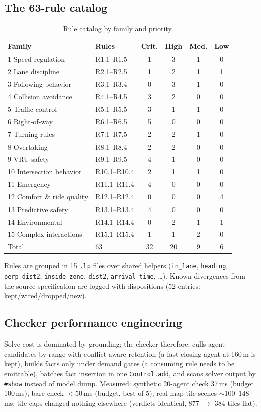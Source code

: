 \documentclass[11pt]{article}
\begin{document}
\subsection{The 63-rule catalog}

\begin{table}[h]
\centering\small
\begin{tabular}{llcccc}
\toprule
Family & Rules & Crit. & High & Med. & Low \\
\midrule
1 Speed regulation & R1.1--R1.5 & 1 & 3 & 1 & 0 \\
2 Lane discipline & R2.1--R2.5 & 1 & 2 & 1 & 1 \\
3 Following behavior & R3.1--R3.4 & 0 & 3 & 1 & 0 \\
4 Collision avoidance & R4.1--R4.5 & 3 & 2 & 0 & 0 \\
5 Traffic control & R5.1--R5.5 & 3 & 1 & 1 & 0 \\
6 Right-of-way & R6.1--R6.5 & 5 & 0 & 0 & 0 \\
7 Turning rules & R7.1--R7.5 & 2 & 2 & 1 & 0 \\
8 Overtaking & R8.1--R8.4 & 2 & 2 & 0 & 0 \\
9 VRU safety & R9.1--R9.5 & 4 & 1 & 0 & 0 \\
10 Intersection behavior & R10.1--R10.4 & 2 & 1 & 1 & 0 \\
11 Emergency & R11.1--R11.4 & 4 & 0 & 0 & 0 \\
12 Comfort \& ride quality & R12.1--R12.4 & 0 & 0 & 0 & 4 \\
13 Predictive safety & R13.1--R13.4 & 4 & 0 & 0 & 0 \\
14 Environmental & R14.1--R14.4 & 0 & 2 & 1 & 1 \\
15 Complex interactions & R15.1--R15.4 & 1 & 1 & 2 & 0 \\
\midrule
Total & 63 & 32 & 20 & 9 & 6 \\
\bottomrule
\end{tabular}
\caption{Rule catalog by family and priority.}
\label{tab:catalog}
\end{table}

Rules are grouped in 15 \texttt{.lp} files over shared helpers
(\texttt{in\_lane}, \texttt{heading}, \texttt{perp\_dist2},
\texttt{inside\_zone}, \texttt{dist2}, \texttt{arrival\_time}, \ldots).
Known divergences from the source specification are logged with
dispositions (52 entries: kept/wired/dropped/new).

\subsection{Checker performance engineering}
Solve cost is dominated by grounding; the checker therefore:
culls agent candidates by range with conflict-aware retention (a fast
closing agent at 160\,m is kept), builds facts only under demand
gates (a consuming rule needs to be emittable), batches fact
insertion in one \texttt{Control.add}, and scans solver output by
\texttt{\#show} instead of model dump. Measured: synthetic 20-agent
check 37\,ms (budget 100\,ms), bare check $<$50\,ms (budget, best-of-5),
real map-tile scenes $\sim$100--148\,ms; tile caps changed nothing
elsewhere (verdicts identical, 877 $\to$ 384 tiles flat).
\end{document}
